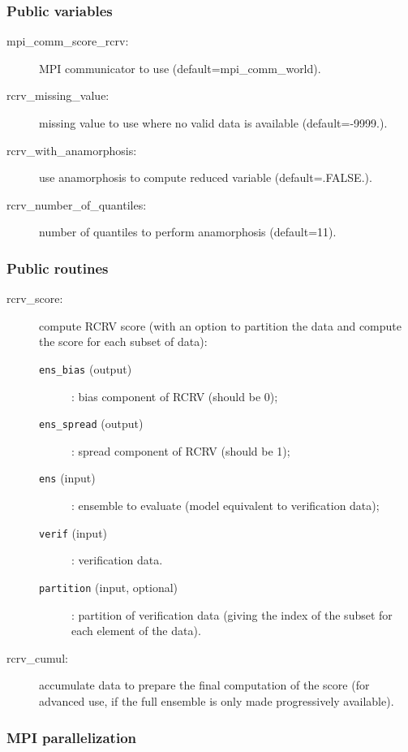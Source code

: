\documentclass[11pt]{article}
\begin{document}
\subsubsection*{Public variables}

\begin{description}
\item[mpi\_comm\_score\_rcrv:] MPI communicator to use (default=mpi\_comm\_world).
\item[rcrv\_missing\_value:] missing value to use where no valid data is available (default=-9999.).
\item[rcrv\_with\_anamorphosis:] use anamorphosis to compute reduced variable (default=.FALSE.).
\item[rcrv\_number\_of\_quantiles:] number of quantiles to perform anamorphosis (default=11).
\end{description}

\subsubsection*{Public routines}

\begin{description}
\item[rcrv\_score:] compute RCRV score (with an option to partition the data
                    and compute the score for each subset of data):
  \begin{description}
  \item[{\tt ens\_bias} (output)]: bias component of RCRV (should be 0);
  \item[{\tt ens\_spread} (output)]: spread component of RCRV (should be 1);
  \item[{\tt ens} (input)]: ensemble to evaluate (model equivalent to verification data);
  \item[{\tt verif} (input)]: verification data.
  \item[{\tt partition} (input, optional)]: partition of verification data
                                  (giving the index of the subset for each element of the data).
  \end{description}
\item[rcrv\_cumul:] accumulate data to prepare the final computation of the score
                    (for advanced use, if the full ensemble is only made progressively available).
\end{description}

\subsubsection*{MPI parallelization}
\end{document}
